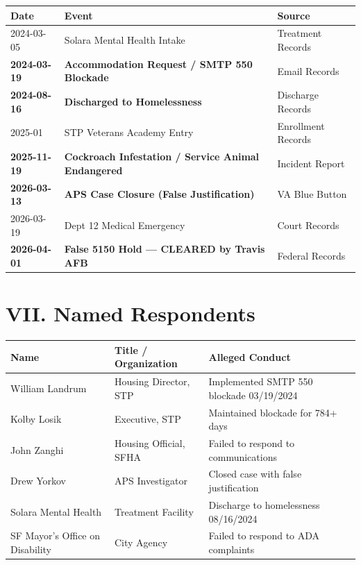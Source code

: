 \documentclass[11pt, a4paper]{article}
\begin{document}
\begin{center}
\begin{longtable}{p{2.5cm}p{6cm}p{4cm}}
\toprule
\textbf{Date} & \textbf{Event} & \textbf{Source} \\
\midrule
\endhead
2024-03-05 & Solara Mental Health Intake & Treatment Records \\
\textbf{2024-03-19} & \textbf{Accommodation Request / SMTP 550 Blockade} & Email Records \\
\textbf{2024-08-16} & \textbf{Discharged to Homelessness} & Discharge Records \\
2025-01 & STP Veterans Academy Entry & Enrollment Records \\
\textbf{2025-11-19} & \textbf{Cockroach Infestation / Service Animal Endangered} & Incident Report \\
\textbf{2026-03-13} & \textbf{APS Case Closure (False Justification)} & VA Blue Button \\
2026-03-19 & Dept 12 Medical Emergency & Court Records \\
\textbf{2026-04-01} & \textbf{False 5150 Hold --- CLEARED by Travis AFB} & Federal Records \\
\bottomrule
\end{longtable}
\end{center}

\vspace{0.5cm}

\section{VII. Named Respondents}

\begin{center}
\begin{tabular}{p{3.5cm}p{4cm}p{5cm}}
\toprule
\textbf{Name} & \textbf{Title / Organization} & \textbf{Alleged Conduct} \\
\midrule
William Landrum & Housing Director, STP & Implemented SMTP 550 blockade 03/19/2024 \\
Kolby Losik & Executive, STP & Maintained blockade for 784+ days \\
John Zanghi & Housing Official, SFHA & Failed to respond to communications \\
Drew Yorkov & APS Investigator & Closed case with false justification \\
Solara Mental Health & Treatment Facility & Discharge to homelessness 08/16/2024 \\
SF Mayor's Office on Disability & City Agency & Failed to respond to ADA complaints \\
\bottomrule
\end{tabular}
\end{center}
\end{document}

